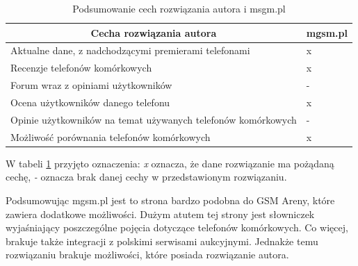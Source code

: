 \begin{table}[H]
\centering
\begin{tabular}{|l|l|}
    \hline
    \multicolumn{1}{|c|}{Cecha rozwiązania autora}    & \multicolumn{1}{c|}{mgsm.pl} \\ \hline
    Aktualne dane, z nadchodzącymi premierami telefonami & x                             \\ \hline
    Recenzje telefonów komórkowych                                  & x                                \\ \hline
    Forum wraz z opiniami użytkowników                   & -                                \\ \hline
    Ocena użytkowników danego telefonu                  & x                             \\ \hline
    Opinie użytkowników na temat używanych telefonów komórkowych    & -                                 \\ \hline
    Możliwość porównania telefonów komórkowych                      & x                                \\ \hline
\end{tabular}
\caption{Podsumowanie cech rozwiązania autora i msgm.pl}
\label{comparison_mgsm}
\end{table}
W tabeli \ref*{comparison_mgsm} przyjęto oznaczenia: \textit{x} oznacza, że dane rozwiązanie ma pożądaną cechę, \textit{-} oznacza brak danej cechy w przedstawionym rozwiązaniu.

Podsumowując mgsm.pl jest to strona bardzo podobna do GSM Areny, które zawiera dodatkowe możliwości. Dużym atutem tej strony jest słowniczek wyjaśniający poszczególne pojęcia dotyczące telefonów komórkowych. Co więcej, brakuje także integracji z polskimi serwisami aukcyjnymi. Jednakże temu rozwiązaniu brakuje możliwości, które posiada rozwiązanie autora.


